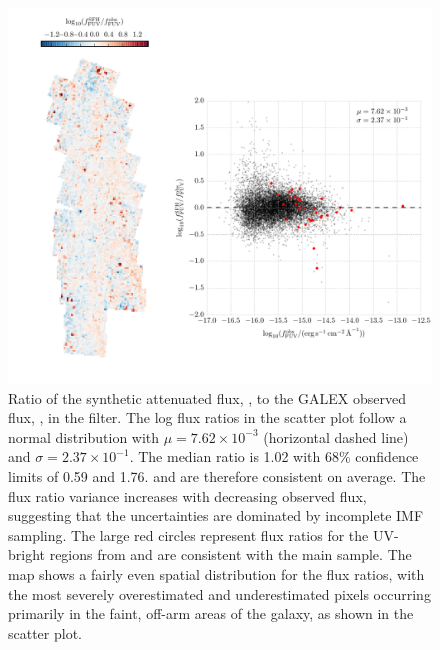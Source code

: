 \documentclass[iop, tighten]{emulateapj}
\begin{document}
\begin{figure}
\centering
\includegraphics[width=\textwidth]{m31flux-figures/flux_fuv_sfh-vs-obs.pdf}
\caption[Ratio of the synthetic flux to the observed flux in the \fuv{}
filter.]{Ratio of the synthetic attenuated flux, \ffuvsfh{}, to the GALEX
    observed flux, \ffuvobs{}, in the \fuv{} filter. The log flux ratios in the
    scatter plot follow a normal distribution with $\mu = 7.62\times 10^{-3}$
    (horizontal dashed line) and $\sigma = 2.37\times 10^{-1}$. The median
    ratio is 1.02 with 68\% confidence limits of 0.59 and 1.76. \ffuvsfh{} and
    \ffuvobs{} are therefore consistent on average. The flux ratio variance
    increases with decreasing observed flux, suggesting that the uncertainties
    are dominated by incomplete IMF sampling. The large red circles represent
    flux ratios for the UV-bright regions from \citet{Simones:2014} and are
    consistent with the main sample. The map shows a fairly even spatial
    distribution for the flux ratios, with the most severely overestimated and
    underestimated pixels occurring primarily in the faint, off-arm areas of
    the galaxy, as shown in the scatter plot.
}
\label{fig:mfx:fuvfluxratio}
\end{figure}
\end{document}
